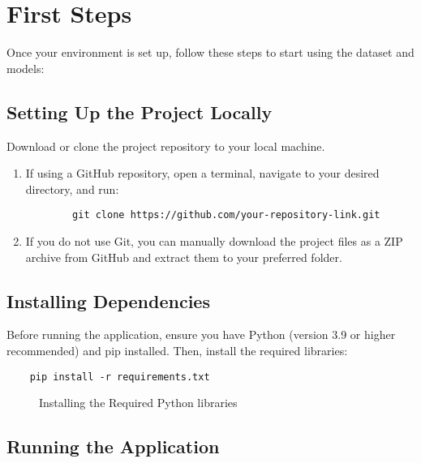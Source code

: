 %
%

\chapter{First Steps}

Once your environment is set up, follow these steps to start using the dataset and models:

\section{Setting Up the Project Locally}

Download or clone the project repository to your local machine.

\begin{enumerate}
	\item If using a GitHub repository, open a terminal, navigate to your desired directory, and run:
	\begin{verbatim}
		git clone https://github.com/your-repository-link.git
	\end{verbatim}
	
	\item If you do not use Git, you can manually download the project files as a ZIP archive from GitHub and extract them to your preferred folder.
\end{enumerate}

\section{Installing Dependencies}

Before running the application, ensure you have Python (version 3.9 or higher recommended) and pip installed. Then, install the required libraries:

\begin{verbatim}
	pip install -r requirements.txt
\end{verbatim}
\begin{figure}[h]
	\centering
	\caption{Installing the Required Python libraries}
\end{figure}


\section{Running the Application}

